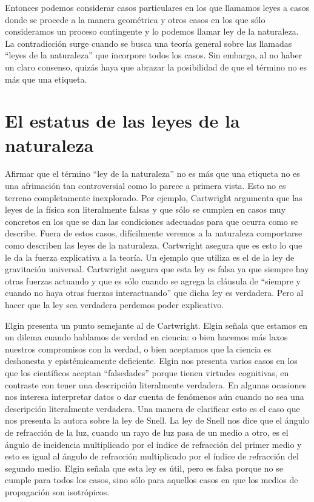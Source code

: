 Entonces podemos considerar casos particulares en los que llamamos leyes a casos donde se procede a la manera geométrica y otros casos en los que sólo consideramos un proceso contingente y lo podemos llamar ley de la naturaleza. La contradicción surge cuando se busca una teoría general sobre las llamadas ``leyes de la naturaleza'' que incorpore todos los casos. Sin embargo, al no haber un claro consenso, quizás haya que abrazar la posibilidad de que el término no es más que una etiqueta.

\section{El estatus de las leyes de la naturaleza}

\noindent Afirmar que el término ``ley de la naturaleza'' no es más que una etiqueta no es una afrimación tan controversial como lo parece a primera vista. Esto no es terreno completamente inexplorado. Por ejemplo, Cartwright \citeyear{Cartwright1983} argumenta que las leyes de la física son literalmente falsas y que sólo se cumplen en casos muy concretos en los que se dan las condiciones adecuadas para que ocurra como se describe. Fuera de estos casos, difícilmente veremos a la naturaleza comportarse como describen las leyes de la naturaleza. Cartwright asegura que es esto lo que le da la fuerza explicativa a la teoría. Un ejemplo que utiliza es el de la ley de gravitación universal. Cartwright asegura que esta ley es falsa ya que siempre hay otras fuerzas actuando y que es sólo cuando se agrega la cláusula de ``siempre y cuando no haya otras fuerzas interactuando'' que dicha ley es verdadera. Pero al hacer que la ley sea verdadera perdemos poder explicativo.

Elgin presenta un punto semejante al de Cartwright. Elgin \citeyear{Elgin2004} señala que estamos en un dilema cuando hablamos de verdad en ciencia: o bien hacemos más laxos nuestros compromisos con la verdad, o bien aceptamos que la ciencia es deshonesta y epistémicamente deficiente. Elgin nos presenta varios casos en los que los científicos aceptan ``falsedades'' porque tienen virtudes cognitivas, en contraste con tener una descripción literalmente verdadera. En algunas ocasiones nos interesa interpretar datos o dar cuenta de fenómenos aún cuando no sea una descripción literalmente verdadera. Una manera de clarificar esto es el caso que nos presenta la autora sobre la ley de Snell. La ley de Snell nos dice que el ángulo de refracción de la luz, cuando un rayo de luz pasa de un medio a otro, es el ángulo de incidencia multiplicado por el índice de refracción del primer medio y esto es igual al ángulo de refracción multiplicado por el índice de refracción del segundo medio. Elgin señala que esta ley es útil, pero es falsa porque no se cumple para todos los casos, sino sólo para aquellos casos en que los medios de propagación son isotrópicos.

